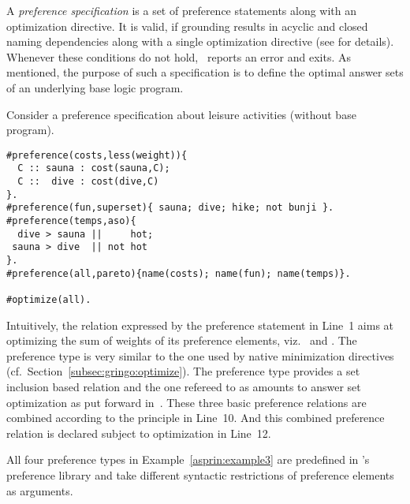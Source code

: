 A \emph{preference specification} is a set of preference statements along with an optimization directive.
It is valid, if grounding results in acyclic and closed naming dependencies
along with a single optimization directive
(see \cite{brderosc15a} for details).
Whenever these conditions do not hold, \asprin\ reports an error and exits.
%
As mentioned,
the purpose of such a specification is to define the optimal answer sets of an underlying base logic program.

\begin{example}\label{asprin:example3}
Consider a preference specification about leisure activities (without base program).
\begin{lstlisting}[escapechar=?]
#preference(costs,less(weight)){ 
  C :: sauna : cost(sauna,C); 
  C ::  dive : cost(dive,C) 
}.
#preference(fun,superset){ sauna; dive; hike; not bunji }.
#preference(temps,aso){
  dive > sauna ||     hot; 
 sauna > dive  || not hot
}.
#preference(all,pareto){name(costs); name(fun); name(temps)}.

#optimize(all).
\end{lstlisting}
Intuitively, the relation expressed by the preference statement  in Line~1 aims at optimizing the sum of weights of its preference elements, 
viz.\  and .
The preference type  is very similar to the one used by native minimization directives (cf.\ Section~\ref{subsec:gringo:optimize}).
The preference type  provides a set inclusion based relation and the one refereed to as 
amounts to answer set optimization as put forward in~\cite{brnitr03a}.
These three basic preference relations are combined according to the  principle in Line~10.
And this combined preference relation is declared subject to optimization in Line~12.
\end{example}
%
\begin{note}
All four preference types in Example~\ref{asprin:example3} are predefined in \asprin's preference library and take different syntactic restrictions of preference elements as arguments.  
\end{note}


